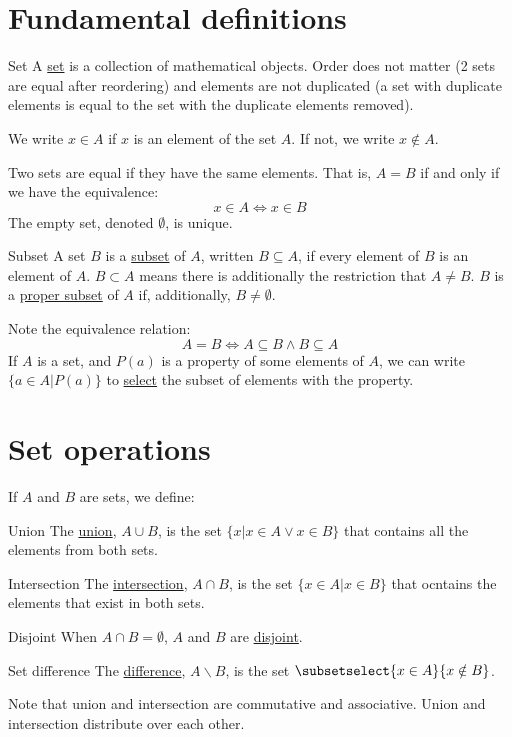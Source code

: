 \documentclass[../Main.tex]{subfiles}
\begin{document}
\section{Fundamental definitions}
\begin{definition}{Set}
    A \underline{set} is a collection of mathematical objects. Order does not matter (2 sets are equal after reordering) and elements are not duplicated (a set with duplicate elements is equal to the set with the duplicate elements removed).
\end{definition}
We write $x \in A$ if $x$ is an element of the set $A$. If not, we write $x \notin A$.\par
Two sets are equal if they have the same elements. That is, $A = B$ if and only if we have the equivalence:
\begin{equation*}
    x \in A \Leftrightarrow x \in B
\end{equation*}
The empty set, denoted $\emptyset$, is unique.
\begin{definition}{Subset}
    A set $B$ is a \underline{subset} of $A$, written $B \subseteq A$, if every element of $B$ is an element of $A$. $B \subset A$ means there is additionally the restriction that $A \neq B$. $B$ is a \underline{proper subset} of $A$ if, additionally, $B \neq \emptyset$.
\end{definition}
Note the equivalence relation:
\begin{equation*}
    A = B \Leftrightarrow A \subseteq B \land B \subseteq A
\end{equation*}
If $A$ is a set, and $P(a)$ is a property of some elements of $A$, we can write $\{a \in A | P(a)\}$ to \underline{select} the subset of elements with the property.
\section{Set operations}
If $A$ and $B$ are sets, we define:
\begin{definition}{Union}
    The \underline{union}, $A \cup B$, is the set $\{x | x \in A \lor x \in B\}$ that contains all the elements from both sets.
\end{definition}
\begin{definition}{Intersection}
    The \underline{intersection}, $A \cap B$, is the set $\{x \in A | x \in B\}$ that ocntains the elements that exist in both sets.
\end{definition}
\begin{definition}{Disjoint}
    When $A \cap B = \emptyset$, $A$ and $B$ are \underline{disjoint}.
\end{definition}
\begin{definition}{Set difference}
    The \underline{difference}, $A \backslash B$, is the set $\subsetselect{x \in A}{x \notin B}$.
\end{definition}
Note that union and intersection are commutative and associative. Union and intersection distribute over each other.
\end{document}
